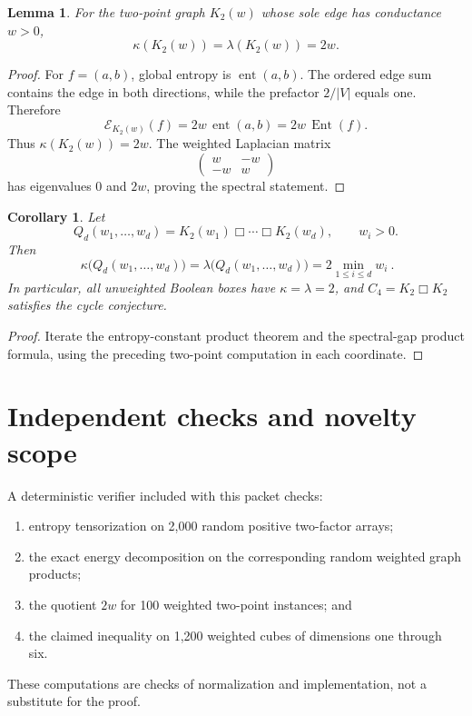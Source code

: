 \documentclass[11pt]{article}
\newtheorem{lemma}{Lemma}
\newtheorem{corollary}{Corollary}
\newcommand{\Ent}{\operatorname{Ent}}
\newcommand{\EE}{\mathcal E}
\newcommand{\ka}{\kappa}
\newcommand{\la}{\lambda}
\newcommand{\BoxProd}{\mathbin{\Box}}
\begin{document}
\begin{lemma}
For the two-point graph \(K_2(w)\) whose sole edge has conductance \(w>0\),
\[
  \ka(K_2(w))=\la(K_2(w))=2w.
\]
\end{lemma}

\begin{proof}
For \(f=(a,b)\), global entropy is
\(\operatorname{ent}(a,b)\).  The ordered edge sum contains the edge in both
directions, while the prefactor \(2/|V|\) equals one.  Therefore
\[
  \EE_{K_2(w)}(f)=2w\,\operatorname{ent}(a,b)
                 =2w\,\Ent(f).
\]
Thus \(\ka(K_2(w))=2w\).  The weighted Laplacian matrix
\[
  \begin{pmatrix}w&-w\\-w&w\end{pmatrix}
\]
has eigenvalues \(0\) and \(2w\), proving the spectral statement.
\end{proof}

\begin{corollary}
Let
\[
 Q_d(w_1,\ldots,w_d)
 =K_2(w_1)\BoxProd\cdots\BoxProd K_2(w_d),
 \qquad w_i>0.
\]
Then
\[
 \boxed{\ 
 \ka\bigl(Q_d(w_1,\ldots,w_d)\bigr)
 =\la\bigl(Q_d(w_1,\ldots,w_d)\bigr)
 =2\min_{1\leq i\leq d}w_i\ }.
\]
In particular, all unweighted Boolean boxes have
\(\ka=\la=2\), and \(C_4=K_2\BoxProd K_2\) satisfies the cycle conjecture.
\end{corollary}

\begin{proof}
Iterate the entropy-constant product theorem and the spectral-gap product
formula, using the preceding two-point computation in each coordinate.
\end{proof}

\section{Independent checks and novelty scope}

A deterministic verifier included with this packet checks:
\begin{enumerate}[leftmargin=2em]
\item entropy tensorization on 2,000 random positive two-factor arrays;
\item the exact energy decomposition on the corresponding random weighted
graph products;
\item the quotient \(2w\) for 100 weighted two-point instances; and
\item the claimed inequality on 1,200 weighted cubes of dimensions one
through six.
\end{enumerate}
These computations are checks of normalization and implementation, not a
substitute for the proof.
\end{document}
